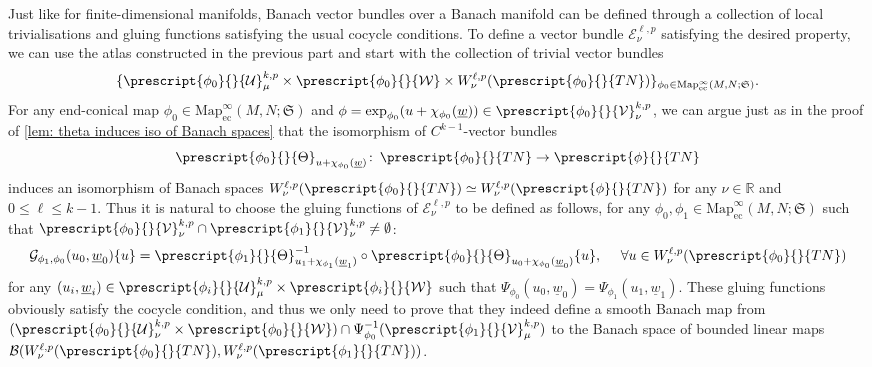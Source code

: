 \documentclass{article}
\numberwithin{equation}{section}        %
\theoremstyle{bfnote}
\theoremstyle{definition}
\theoremstyle{bfremark}
\newcommand{\col}{\colon \thinspace}        %
\newcommand{\R}{\mathbb{R}}                 %
\newcommand{\Map}{\mathrm{Map}}             %
\begin{document}
Just like for finite-dimensional manifolds, Banach vector bundles over a Banach manifold can be defined through a collection of local trivialisations and gluing functions satisfying the usual cocycle conditions. To define a vector bundle $\mathcal{E}^{\ell,p}_\nu$ satisfying the desired property, we can use the atlas constructed in the previous part and start with the collection of trivial vector bundles
\begin{equation}        \label{eq: local trivialisations}
    \{ \prescript{\phi_0}{}{\mathcal{U}}^{k,p}_\mu \times \prescript{\phi_0}{}{\mathcal{W}} \times W^{\ell,p}_\nu(\prescript{\phi_0}{}{TN}) \}_{\phi_0 \in \Map^\infty_{\mathrm{ec}}(M,N;\mathfrak{S})} .
\end{equation}
For any end-conical map $\phi_0 \in \Map^\infty_{\mathrm{ec}}(M,N;\mathfrak{S})$ and $\phi = \exp_{\phi_0}(u+\chi_{\phi_0}(\underline{w})) \in \prescript{\phi_0}{}{\mathcal{V}}^{k,p}_\nu$, we can argue just as in the proof of \cref{lem: theta induces iso of Banach spaces} that the isomorphism of $C^{k-1}$-vector bundles
\begin{equation*}
    \prescript{\phi_0}{}{\Theta}_{u+\chi_{\phi_0}(\underline{w})} \col \prescript{\phi_0}{}{TN} \to \prescript{\phi}{}{TN}
\end{equation*}
induces an isomorphism of Banach spaces $W^{\ell,p}_\nu(\prescript{\phi_0}{}{TN}) \simeq W^{\ell,p}_\nu(\prescript{\phi}{}{TN})$ for any $\nu \in \R$ and $0 \leq \ell \leq k-1$. Thus it is natural to choose the gluing functions of $\mathcal{E}^{\ell,p}_\nu$ to be defined as follows, for any $\phi_0,\phi_1 \in \Map^\infty_{\mathrm{ec}}(M,N;\mathfrak{S})$ such that $\prescript{\phi_0}{}{\mathcal{V}}^{k,p}_\nu \cap \prescript{\phi_1}{}{\mathcal{V}}^{k,p}_\nu \neq \emptyset$:
\begin{equation}       \label{eq: gluing functions}
    \mathcal{G}_{\phi_1,\phi_0}(u_0,\underline{w}_0)\{u\} = \prescript{\phi_1}{}{\Theta}_{u_1+\chi_{\phi_1}(\underline{w}_1)}^{-1} \circ \prescript{\phi_0}{}{\Theta}_{u_0+\chi_{\phi_0}(\underline{w}_0)} \{u\}, ~~~~ \forall u \in W^{\ell,p}_\nu(\prescript{\phi_0}{}{TN})
\end{equation}
for any $(u_i,\underline{w}_i) \in \prescript{\phi_i}{}{\mathcal{U}}^{k,p}_\mu \times \prescript{\phi_i}{}{\mathcal{W}}$ such that $\Psi_{\phi_0}(u_0,\underline{w}_0) = \Psi_{\phi_1}(u_1,\underline{w}_1)$. These gluing functions obviously satisfy the cocycle condition, and thus we only need to prove that they indeed define a smooth Banach map from $(\prescript{\phi_0}{}{\mathcal{U}}^{k,p}_\nu \times \prescript{\phi_0}{}{\mathcal{W}}) \cap \Psi_{\phi_0}^{-1}(\prescript{\phi_1}{}{\mathcal{V}}^{k,p}_\mu)$ to the Banach space of bounded linear maps $\mathcal{B}(W^{\ell,p}_\nu(\prescript{\phi_0}{}{TN}),W^{\ell,p}_\nu(\prescript{\phi_1}{}{TN}))$. 
\end{document}
